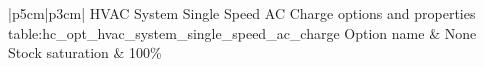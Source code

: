 \begin{customLongTable}{ |p{5cm}|p{3cm}| }
{HVAC System Single Speed AC Charge options and properties} {table:hc_opt_hvac_system_single_speed_ac_charge}
{Option name & None}
\endhead
\hline
Stock saturation & 100\% \\ \hline
\end{customLongTable}
